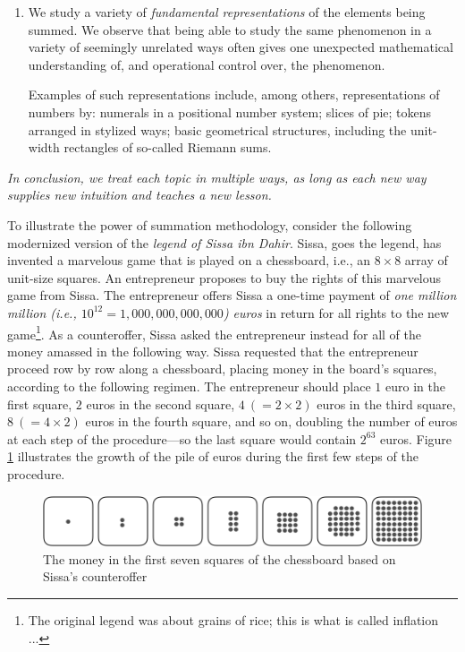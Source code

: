 \begin{enumerate}
\medskip\item
We study a variety of {\it fundamental representations} of the elements being summed.  We observe that being able to study the same phenomenon in a variety of seemingly unrelated ways often gives one unexpected mathematical understanding of, and operational control over, the phenomenon.

\smallskip

Examples of such representations include, among others, representations of numbers by: numerals in a positional number system; slices of pie; tokens arranged in stylized ways; basic geometrical structures, including the unit-width rectangles of so-called Riemann sums.
\end{enumerate}

\medskip

\noindent
{\em In conclusion, we treat each topic in multiple ways, as long as each new way supplies new intuition and teaches a new lesson.}

\bigskip


To illustrate the power of summation methodology, consider the following modernized version of the {\it legend of Sissa ibn Dahir}.  Sissa, goes the legend, has invented a marvelous game that is played on a chessboard, i.e., an $8 \times 8$ array of unit-size squares.  An entrepreneur proposes to buy the rights of this marvelous game from Sissa.  The entrepreneur offers Sissa a one-time payment of {\em one million million (i.e., $10^{12} = 1,000,000,000,000$) euros} in return for all rights to the new game\footnote{The original legend was about grains of rice; this is what is called {inflation} ...}.  As a counteroffer, Sissa asked the entrepreneur instead for all of the money amassed in the following way.  Sissa requested that the entrepreneur proceed row by row along a chessboard, placing money in the board's squares, according to the following regimen.  The entrepreneur should place $1$ euro in the first square, $2$ euros in the second square, $4 \ (= 2 \times 2)$ euros in the third square, $8 \ (= 4 \times 2)$ euros in the
fourth square, and so on, doubling the number of euros at each step of the procedure---so the last square would contain $2^{63}$ euros.  Figure \ref{fig:Sissa} illustrates the growth of the pile of euros during the first few steps of the procedure.
\begin{figure}[ht]
\begin{center}
       \includegraphics[scale=0.3]{FiguresMaths/chess}
\caption{The money in the first seven squares of the chessboard based on Sissa's counteroffer}
       \label{fig:Sissa}
\end{center}
\end{figure}

